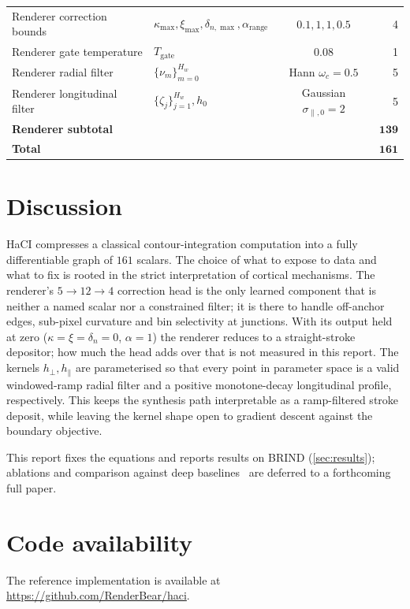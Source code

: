 \documentclass[11pt,a4paper]{article}
\begin{document}
\begin{table}[htbp]
\begin{tabular}{llcr}
Renderer correction bounds & $\kappa_{\max}, \xi_{\max}, \delta_{n,\max}, \alpha_{\mathrm{range}}$ & $0.1, 1, 1, 0.5$ & 4 \\
Renderer gate temperature & $T_{\mathrm{gate}}$ & $0.08$ & 1 \\
Renderer radial filter & $\{\nu_m\}_{m=0}^{H_w}$ & Hann $\omega_c=0.5$ & 5 \\
Renderer longitudinal filter & $\{\zeta_j\}_{j=1}^{H_w}, h_0$ & Gaussian $\sigma_{\parallel,0}=2$ & 5 \\
\midrule
\multicolumn{3}{l}{\textbf{Renderer subtotal}} & $\bm{139}$ \\
\midrule
\multicolumn{3}{l}{\textbf{Total}} & $\bm{161}$ \\
\bottomrule
\end{tabular}
\end{table}

\section{Discussion}\label{sec:discussion}

HaCI compresses a classical contour-integration computation into a fully differentiable graph of $161$ scalars. The choice of what to expose to data and what to fix is rooted in the strict interpretation of cortical mechanisms. The renderer's $5 \to 12 \to 4$ correction head is the only learned component that is neither a named scalar nor a constrained filter; it is there to handle off-anchor edges, sub-pixel curvature and bin selectivity at junctions. With its output held at zero ($\kappa = \xi = \delta_n = 0$, $\alpha = 1$) the renderer reduces to a straight-stroke depositor; how much the head adds over that is not measured in this report. The kernels $h_{\perp}, h_{\parallel}$ are parameterised so that every point in parameter space is a valid windowed-ramp radial filter and a positive monotone-decay longitudinal profile, respectively. This keeps the synthesis path interpretable as a ramp-filtered stroke deposit, while leaving the kernel shape open to gradient descent against the boundary objective.

This report fixes the equations and reports results on BRIND (\cref{sec:results}); ablations and comparison against deep baselines~\cite{xie2015hed,liu2017rcf,he2019bdcn,pu2022edter,soria2023dexined,ye2024diffusionedge} are deferred to a forthcoming full paper.

\section*{Code availability}
The reference implementation is available at \url{https://github.com/RenderBear/haci}.
\end{document}
